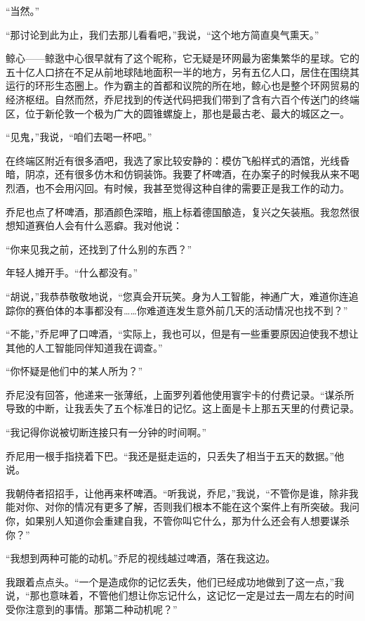 \documentclass[AutoFakeBold=true]{book}
\begin{document}
``当然。''

``那讨论到此为止，我们去那儿看看吧，''我说，``这个地方简直臭气熏天。''

\vspace*{1em}

鲸心——鲸逖中心很早就有了这个昵称，它无疑是环网最为密集繁华的星球。它的五十亿人口挤在不足从前地球陆地面积一半的地方，另有五亿人口，居住在围绕其运行的环形生态圈上。作为霸主的首都和议院的所在地，鲸心也是整个环网贸易的经济枢纽。自然而然，乔尼找到的传送代码把我们带到了含有六百个传送门的终端区，位于新伦敦一个极为广大的圆锥螺旋上，那也是最古老、最大的城区之一。

``见鬼，''我说，``咱们去喝一杯吧。''

在终端区附近有很多酒吧，我选了家比较安静的：模仿飞船样式的酒馆，光线昏暗，阴凉，还有很多仿木和仿铜装饰。我要了杯啤酒，在办案子的时候我从来不喝烈酒，也不会用闪回。有时候，我甚至觉得这种自律的需要正是我工作的动力。

乔尼也点了杯啤酒，那酒颜色深暗，瓶上标着德国酿造，复兴之矢装瓶。我忽然很想知道赛伯人会有什么恶癖。我对他说：

``你来见我之前，还找到了什么别的东西？''

年轻人摊开手。``什么都没有。''

``胡说，''我恭恭敬敬地说，``您真会开玩笑。身为人工智能，神通广大，难道你连追踪你的赛伯体的本事都没有……你难道连发生意外前几天的活动情况也找不到？''

``不能，''乔尼呷了口啤酒，``实际上，我也可以，但是有一些重要原因迫使我不想让其他的人工智能同伴知道我在调查。''

``你怀疑是他们中的某人所为？''

乔尼没有回答，他递来一张薄纸，上面罗列着他使用寰宇卡的付费记录。``谋杀所导致的中断，让我丢失了五个标准日的记忆。这上面是卡上那五天里的付费记录。

``我记得你说被切断连接只有一分钟的时间啊。''

乔尼用一根手指挠着下巴。``我还是挺走运的，只丢失了相当于五天的数据。''他说。

我朝侍者招招手，让他再来杯啤酒。``听我说，乔尼，''我说，``不管你是谁，除非我能对你、对你的情况有更多了解，否则我们根本不能在这个案件上有所突破。我问你，如果别人知道你会重建自我，不管你叫它什么，那为什么还会有人想要谋杀你？''

``我想到两种可能的动机。''乔尼的视线越过啤酒，落在我这边。

我跟着点点头。``一个是造成你的记忆丢失，他们已经成功地做到了这一点，''我说，``那也意味着，不管他们想让你忘记什么，这记忆一定是过去一周左右的时间受你注意到的事情。那第二种动机呢？''
\end{document}
